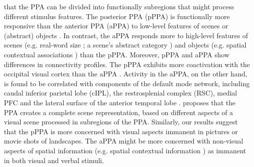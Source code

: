 \documentclass[english]{article}
\begin{document}
that the PPA can be divided into functionally subregions that might process
different stimulus features.
The posterior PPA (pPPA) is functionally more responsive than the anterior PPA
(aPPA) to low-level features of scenes or (abstract) objects
\citep{baldassano2013differential, nasr2014thinking,
rajimehr2011parahippocampal}.
In contrast, the aPPA responds more to high-level features of scenes (e.g.
real-word size \citep{park2015parametric}; a scene's abstract category
\citep{marchette2015outside, watson2016patterns}) and objects (e.g. spatial
contextual associations \citep{aminoff2007parahippocampal, aminoff2013role})
than the pPPA.
Moreover, pPPA and aPPA show differences in connectivity profiles.
The pPPA exhibits more coactivation with the occipital visual cortex than the
aPPA \citep{baldassano2013differential, baldassano2016two}.
Activity in the aPPA, on the other hand, is found to be correlated with
components of the default mode network, including caudal inferior parietal lobe
(cIPL), the restrosplenial complex (RSC), medial PFC and the lateral surface of
the anterior temporal lobe \citep{baldassano2013differential,
baldassano2016two}.
\cite{baldassano2013differential} proposes that the PPA creates a complete
scene representation, based on different aspects of a visual scene processed in
subregions of the PPA.
Similarly, our results suggest that the pPPA is more concerned with visual
aspects immanent in pictures or movie shots of landscapes.
The aPPA might be more concerned with non-visual aspects of spatial information
(e.g. spatial contextual information \citep{aminoff2007parahippocampal}) as
immanent in both visual and verbal stimuli.
\end{document}
